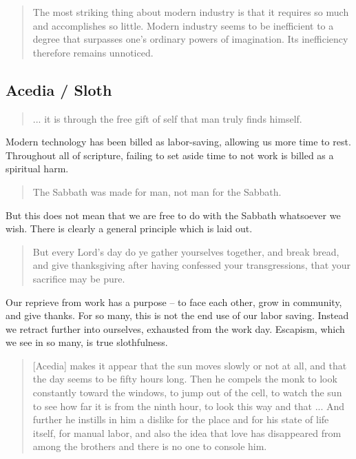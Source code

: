\documentclass[letterpaper]{article}
\begin{document}
    \begin{quote}
      The most striking thing about modern industry is that it requires so much and accomplishes so little. Modern industry seems to be inefficient to a degree that surpasses one's ordinary powers of imagination. Its inefficiency therefore remains unnoticed.
    \end{quote}


  \subsection{Acedia / Sloth}

    \begin{quote}
      ... it is through the free gift of self that man truly finds himself.
    \end{quote}

    Modern technology has been billed as labor-saving, allowing us more time to rest. Throughout all of scripture, failing to set aside time to not work is billed as a spiritual harm.

    \begin{quote}
      The Sabbath was made for man, not man for the Sabbath.
    \end{quote}

    But this does not mean that we are free to do with the Sabbath whatsoever we wish. There is clearly a general principle which is laid out.

    \begin{quote}
      But every Lord's day do ye gather yourselves together, and break bread, and give thanksgiving after having confessed your transgressions, that your sacrifice may be pure.
    \end{quote}

    Our reprieve from work has a purpose -- to face each other, grow in community, and give thanks. For so many, this is not the end use of our labor saving. Instead we retract further into ourselves, exhausted from the work day. Escapism, which we see in so many, is true slothfulness.

    \begin{quote}
      [Acedia] makes it appear that the sun moves slowly or not at all, and that the day seems to be fifty hours long. Then he compels the monk to look constantly toward the windows, to jump out of the cell, to watch the sun to see how far it is from the ninth hour, to look this way and that ... And further he instills in him a dislike for the place and for his state of life itself, for manual labor, and also the idea that love has disappeared from among the brothers and there is no one to console him.
    \end{quote}
\end{document}
